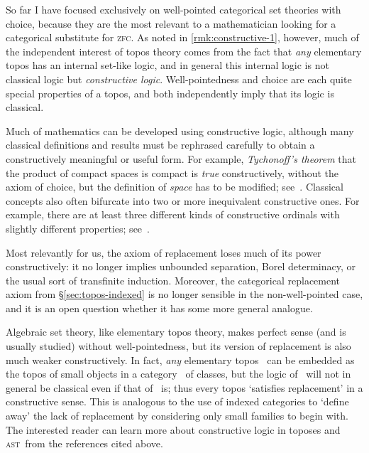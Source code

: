 \documentclass{amsart}
\def\zfc{\textsc{zfc}}
\def\ast{\textsc{ast}}
\begin{document}

\begin{rmk}\label{rmk:constructive-2}
  So far I have focused exclusively on well-pointed categorical set
  theories with choice, because they are the most relevant to a
  mathematician looking for a categorical substitute for \zfc.  As
  noted in \autoref{rmk:constructive-1}, however, much of the
  independent interest of topos theory comes from the fact that
  \emph{any} elementary topos has an internal set-like logic, and in
  general this internal logic is not classical logic but
  \emph{constructive logic}.  Well-pointedness and choice are each
  quite special properties of a topos, and both independently imply
  that its logic is classical.

  Much of mathematics can be developed using constructive logic,
  although many classical definitions and results must be rephrased
  carefully to obtain a constructively meaningful or useful form.  For
  example, \emph{Tychonoff's theorem} that the product of compact
  spaces is compact is \emph{true} constructively, without the axiom
  of choice, but the definition of \emph{space} has to be modified;
  see~\cite[Part~C]{ptj:elephant}.  Classical concepts also often
  bifurcate into two or more inequivalent constructive ones.  For
  example, there are at least three different kinds of constructive
  ordinals with slightly different properties;
  see~\cite{jm:ast,taylor:ordinals}.

  Most relevantly for us, the axiom of replacement loses much of its
  power constructively: it no longer implies unbounded separation,
  Borel determinacy, or the usual sort of transfinite induction.
  Moreover, the categorical replacement axiom from
  \S\ref{sec:topos-indexed} is no longer sensible in the
  non-well-pointed case, and it is an open question whether it has
  some more general analogue.

  Algebraic set theory, like elementary topos theory, makes perfect
  sense (and is usually studied) without well-pointedness, but its
  version of replacement is also much weaker constructively.  In fact,
  \emph{any} elementary topos \bS\ can be embedded as the topos of
  small objects in a category \bC\ of classes, but the logic of \bC\
  will not in general be classical even if that of \bS\ is; thus every
  topos `satisfies replacement' in a constructive sense.  This is
  analogous to the use of indexed categories to `define away' the lack
  of replacement by considering only small families to begin with.
  The interested reader can learn more about constructive logic in
  toposes and \ast\ from the references cited above.
\end{rmk}
\end{document}
